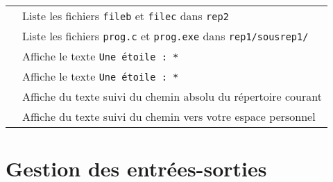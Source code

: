 \documentclass [a4paper]{article}
\begin{document}
\begin{tabular}{ ll }
\hspace{0.5cm}{\verb+ls ../../rep2/file?+}          & Liste les fichiers \verb+fileb+ et \verb+filec+ dans \verb+rep2+ \\
\hspace{0.5cm}{\verb+ls prog.*+}                    & Liste les fichiers \verb+prog.c+ et \verb+prog.exe+ dans \verb+rep1/sousrep1/+ \\
\hspace{0.5cm}{\verb+echo Une étoile : \*+}         & Affiche le texte \og{} \verb+Une étoile : *+ \fg{} \\
\hspace{0.5cm}{\verb+echo "Une étoile : *"+}        & Affiche le texte \og{} \verb+Une étoile : *+ \fg{} \\
\hspace{0.5cm}{\verb+echo "Je suis dans `pwd`"+}    & Affiche du texte suivi du chemin absolu du répertoire courant\\
\hspace{0.5cm}{\verb+echo "J'habite dans $HOME"+}   & Affiche du texte suivi du chemin vers votre espace personnel \\
\hline
\end{tabular} 


\section*{Gestion des entrées-sorties}
\end{document}
